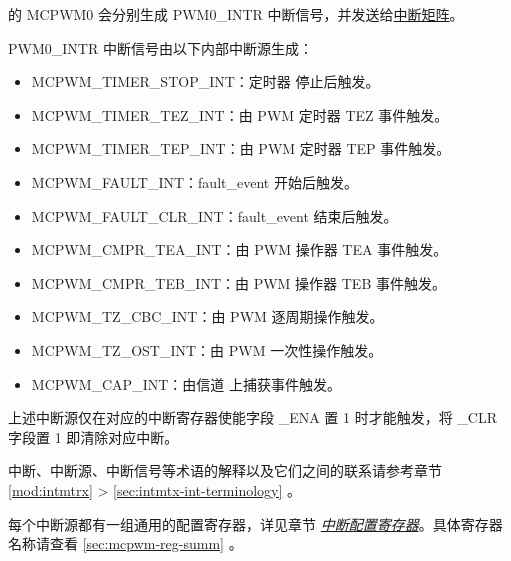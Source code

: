 \documentclass[main\_\_CN.tex]{subfiles}
\begin{document}
\chipname{} 的 MCPWM0 会分别生成 PWM0\_INTR 中断信号，并发送给\hyperref[mod:intmtrx]{中断矩阵}。

PWM0\_INTR 中断信号由以下内部中断源生成：

\begin{itemize}
\item \label{int:mcpwm-timer-stop}MCPWM\_TIMER\_STOP\_INT：定时器 停止后触发。
\item \label{int:mcpwm-timer-TEZ}MCPWM\_TIMER\_TEZ\_INT：由 PWM 定时器 TEZ 事件触发。
\item \label{int:mcpwm-timer-tep}MCPWM\_TIMER\_TEP\_INT：由 PWM 定时器 TEP 事件触发。
\item \label{int:mcpwm-fault}MCPWM\_FAULT\_INT：fault\_event 开始后触发。
\item \label{int:mcpwm-fault-clr}MCPWM\_FAULT\_CLR\_INT：fault\_event 结束后触发。
\item \label{int:mcpwm-cmpr-tea}MCPWM\_CMPR\_TEA\_INT：由 PWM 操作器 TEA 事件触发。
\item \label{int:mcpwm-cmpr-teb}MCPWM\_CMPR\_TEB\_INT：由 PWM 操作器 TEB 事件触发。
\item \label{int:mcpwm-tz-cbc}MCPWM\_TZ\_CBC\_INT：由 PWM 逐周期操作触发。
\item \label{int:mcpwm-tz-ost}MCPWM\_TZ\_OST\_INT：由 PWM 一次性操作触发。
\item \label{int:mcpwm-cap}MCPWM\_CAP\_INT：由信道 上捕获事件触发。
\end{itemize}

上述中断源仅在对应的中断寄存器使能字段 \_ENA 置 1 时才能触发，将 \_CLR 字段置 1 即清除对应中断。

\begin{tiplisting}
中断、中断源、中断信号等术语的解释以及它们之间的联系请参考章节 \ref{mod:intmtrx} \textit{} > \ref{sec:intmtx-int-terminology} \textit{}。
\end{tiplisting}

每个中断源都有一组通用的配置寄存器，详见章节 \hyperref[interrupt-config-registers]{\textit{中断配置寄存器}}。具体寄存器名称请查看 \ref{sec:mcpwm-reg-summ} \textit{}。
\end{document}
